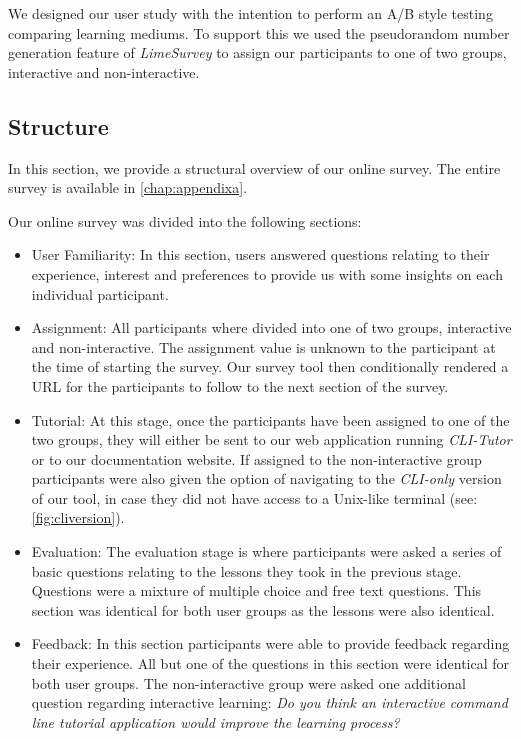 We designed our user study with the intention to perform an A/B style testing
comparing learning mediums. To support this we used the pseudorandom number
generation feature of \textit{LimeSurvey} to assign our participants to one of
two groups, interactive and non-interactive.

\subsection{Structure}

In this section, we provide a structural overview of our online survey. The
entire survey is available in \autoref{chap:appendixa}.

Our online survey was divided into the following sections:

\begin{itemize}

	\item User Familiarity: In this section, users answered questions relating
	      to their experience, interest and preferences to provide us with some
	      insights on each individual participant.

	\item Assignment: All participants where divided into one of two groups,
	      interactive and non-interactive. The assignment value is unknown to the
	      participant at the time of starting the survey. Our survey tool then
	      conditionally rendered a URL for the participants to follow to the next
	      section of the survey.

	\item Tutorial: At this stage, once the participants have been assigned to
	      one of the two groups, they will either be sent to our web application
	      running \textit{CLI-Tutor} or to our documentation website. If assigned
	      to the non-interactive group participants were also given the option of
	      navigating to the  \textit{CLI-only} version of our tool, in case they
	      did not have access to a Unix-like terminal (see:
	      \autoref{fig:cliversion}).

	\item Evaluation: The evaluation stage is where participants were asked a
	      series of basic questions relating to the lessons they took in the
	      previous stage. Questions were a mixture of multiple choice and free
	      text questions. This section was identical for both user groups as the
	      lessons were also identical.

	\item Feedback: In this section participants were able to provide feedback
	      regarding their experience. All but one of the questions in this
	      section were identical for both user groups. The non-interactive group
	      were asked one additional question regarding interactive learning:
	      \textit{Do you think an interactive command line tutorial application
		      would improve the learning process?}


\end{itemize}
